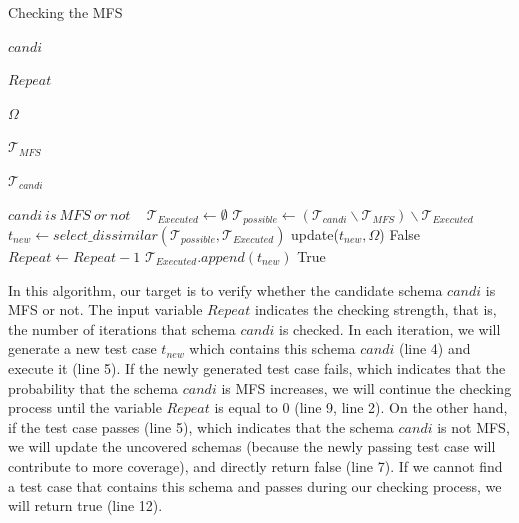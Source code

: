 \documentclass[10pt,journal,compsoc]{IEEEtran}
\begin{document}
\begin{algorithm}
  \caption{Checking the MFS}
  \begin{algorithmic}[1]
     \Require


     $candi$ 


     $Repeat$  

     $\Omega$ 

     $\mathcal{T}_{MFS}$ 

     $\mathcal{T}_{candi}$ 


\Ensure  $candi\ is\ MFS\ or\ not $
\
       \State $\mathcal{T}_{Executed} \leftarrow \emptyset$
         \State $\mathcal{T}_{possible} \leftarrow (\mathcal{T}_{candi} \backslash \mathcal{T}_{MFS}) \backslash \mathcal{T}_{Executed} $
         \State $t_{new} \leftarrow select\_dissimilar(\mathcal{T}_{possible}, \mathcal{T}_{Executed})$
         \If {$execute(t_{new}$) == PASS}
          \State update($t_{new}, \Omega$)
          \State \Return   False
         \EndIf
         \State  $Repeat \leftarrow Repeat -1 $
         \State $\mathcal{T}_{Executed}.append(t_{new}) $
       \EndWhile
    \State \Return   True
  \end{algorithmic}
\end{algorithm}


In this algorithm, our target is to verify whether the candidate schema $candi$ is MFS or not. The input variable $Repeat$ indicates the checking strength, that is, the number of iterations that schema $candi$ is checked.  In each iteration, we will generate a new test case $t_{new}$ which contains this schema $candi$  (line 4) and execute it (line 5). If the newly generated test case fails, which indicates that the probability that the schema $candi$ is MFS increases, we will continue the checking process until the variable $Repeat$ is equal to 0 (line 9, line 2). On the other hand, if the test case passes (line 5), which indicates that the schema $candi$ is not MFS, we will update the uncovered schemas (because the newly passing test case will contribute to more coverage), and directly return false (line 7). If we cannot find a test case that contains this schema and passes during our checking process, we will return true (line 12).
\end{document}
